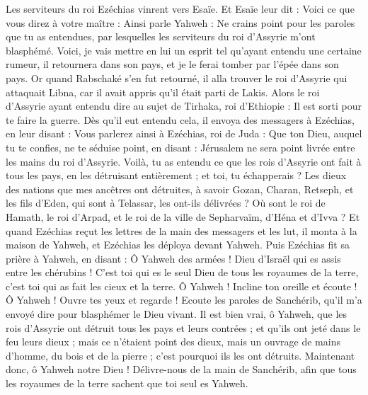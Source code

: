 \begin{multicols}{2}
Les serviteurs du roi Ezéchias vinrent vers Esaïe.
Et Esaïe leur dit : Voici ce que vous direz à votre maître : Ainsi parle Yahweh : Ne crains point pour les paroles que tu as entendues, par lesquelles les serviteurs du roi d'Assyrie m'ont blasphémé.
Voici, je vais mettre en lui un esprit tel qu'ayant entendu une certaine rumeur, il retournera dans son pays, et je le ferai tomber par l'épée dans son pays.
Or quand Rabschaké s'en fut retourné, il alla trouver le roi d'Assyrie qui attaquait Libna, car il avait appris qu'il était parti de Lakis.
Alors le roi d'Assyrie ayant entendu dire au sujet de Tirhaka, roi d'Ethiopie : Il est sorti pour te faire la guerre. Dès qu'il eut entendu cela, il envoya des messagers à Ezéchias, en leur disant :
Vous parlerez ainsi à Ezéchias, roi de Juda : Que ton Dieu, auquel tu te confies, ne te séduise point, en disant : Jérusalem ne sera point livrée entre les mains du roi d'Assyrie.
Voilà, tu as entendu ce que les rois d'Assyrie ont fait à tous les pays, en les détruisant entièrement ; et toi, tu échapperais ?
Les dieux des nations que mes ancêtres ont détruites, à savoir Gozan, Charan, Retseph, et les fils d'Eden, qui sont à Telassar, les ont-ils délivrées ?
Où sont le roi de Hamath, le roi d'Arpad, et le roi de la ville de Sepharvaïm, d'Héna et d'Ivva ?
Et quand Ezéchias reçut les lettres de la main des messagers et les lut, il monta à la maison de Yahweh, et Ezéchias les déploya devant Yahweh.
Puis Ezéchias fit sa prière à Yahweh, en disant :
Ô Yahweh des armées ! Dieu d'Israël qui es assis entre les chérubins ! C'est toi qui es le seul Dieu de tous les royaumes de la terre, c'est toi qui as fait les cieux et la terre.
Ô Yahweh ! Incline ton oreille et écoute ! Ô Yahweh ! Ouvre tes yeux et regarde ! Ecoute les paroles de Sanchérib, qu'il m'a envoyé dire pour blasphémer le Dieu vivant.
Il est bien vrai, ô Yahweh, que les rois d'Assyrie ont détruit tous les pays et leurs contrées ;
et qu'ils ont jeté dans le feu leurs dieux ; mais ce n'étaient point des dieux, mais un ouvrage de mains d'homme, du bois et de la pierre ; c'est pourquoi ils les ont détruits.
Maintenant donc, ô Yahweh notre Dieu ! Délivre-nous de la main de Sanchérib, afin que tous les royaumes de la terre sachent que toi seul es Yahweh.

\end{multicols}

